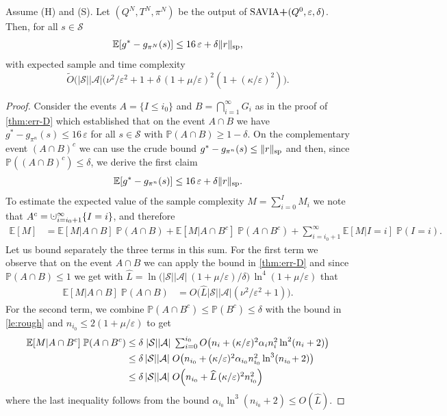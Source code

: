 \documentclass{article}
\newcommand{\cA}{\mathcal{A}}
\newcommand{\cS}{\mathcal{S}}
\newcommand{\expec}{\mathbb{E}}
\newcommand{\prob}{\mathbb{P}}
\renewcommand{\sp}[1]{\|{#1}\|_\text{\rm sp}}
\newcommand{\R}{r}
\newcommand{\cupdot}{\mathbin{\mathaccent\cdot\cup}}
\newenvironment{manualtheorem}[1]{%
    \renewcommand\themanualtheoreminner{#1}%
  \manualtheoreminner
}{\endmanualtheoreminner}
\theoremstyle{plain}
\theoremstyle{definition}
\theoremstyle{remark}
\begin{document}
\vspace{1ex}
\begin{manualtheorem}{\ref{thm:E-err-D}}
Assume \mbox{\sc (H)} and \mbox{\sc (S)}. Let $(Q^N,T^N,\pi^N)$ be the output of $\mbox{\rm SAVIA\textbf{+}}(Q^0,\varepsilon,\delta)$. Then, for all $s\in\cS$
$$\expec[g^*-g_{\pi^N}(s)] \leq 16\,\varepsilon +\delta \sp{r},$$
    with expected sample and time complexity
 $$\widetilde{O}\big(|\cS||\cA|\mbox{$(\nu^{2}/{\varepsilon^{2}}+1 +
    \delta\, (1+\mu/\varepsilon)^2(1+(\kappa/\varepsilon)^2)$}\big).$$
\end{manualtheorem}
\begin{proof}
Consider the events $A= \{I\leq i_0\}$ and $B= \bigcap_{i=1}^\infty G_i$ as in the proof of
\cref{thm:err-D} which established that 
on the event $A\cap B$ we have $g^*-g_{\pi^n}(s)\leq 16\,\varepsilon$ for all $s \in \cS$ with
$\prob(A\cap B)\geq 1-\delta$.
On the complementary event $(A\cap B)^c$ we can use the crude bound $g^*-g_{\pi^n}(s)\leq \sp{\R}$ and then, since $\prob((A\cap B)^c)\leq\delta$, we derive the first claim
    \[
    \expec[g^*-g_{\pi^n}(s)]\leq 16\,\varepsilon +  \delta\sp{\R}.
    \]
To estimate the expected value of the sample complexity $M=\sum_{i=0}^IM_i$ we note
that $A^c= \cupdot_{i=i_0+1}^\infty \{ I=i\}$, 
and therefore
\begin{align*}
    \expec[M]&=\mbox{$\expec[M|A \cap B ]\; \prob(A \cap B) +\expec[M | A \cap B^c ] \;\prob(A \cap B^c)+\sum_{i=i_0+1}^\infty \expec[M | I=i] \;\prob( I=i).$}
\end{align*}  
Let us bound separately the three terms in this sum. 
For the first term we observe that on the event $A\cap B$ we
can apply the bound in \cref{thm:err-D} and since $\prob(A \cap B) \leq1$ we get with $\widehat{L}=\ln\!\big(|\cS||\cA|\,(1\!+\!\mu/\varepsilon)/\delta\big)\,\ln^4(1\!+\!\mu/\varepsilon)$ that
\[
\begin{aligned}
\expec[M|A \cap B ]\; \prob(A \cap B)
&= {O}\big(\widehat{L}|\cS||\cA|(\nu^{2}/{\varepsilon^{2}}+1)\big).
\end{aligned}  
\]
For the second term, we combine $\prob(A \cap B^c)\leq \prob(B^c)\leq \delta $ with the bound in \cref{le:rough} and $n_{i_0}\leq 2(1+\mu/\varepsilon)$ to get
\begin{align*}
\expec[M|A \cap B^c ]\; \prob(A \cap B^c)&\leq \delta\;\mbox{$ |\cS||\cA|\;\sum_{i=0}^{i_0}O\!\left (n_i+{(\kappa/\varepsilon)^2\alpha_i n_i^2 \ln^2(n_i+2)} \right )$}\\&\leq \delta\,|\cS||\cA|\;\mbox{$O \!\left (n_{i_0}+(\kappa/\varepsilon)^2\alpha_{i_{0}} n_{i_{0}}^2 \ln^3(n_{i_0}\!+2) \right ) $}\\&\leq \delta\,|\cS||\cA|\;\mbox{$O \!\left (n_{i_0}+\widehat{L}\,(\kappa/\varepsilon)^2 n_{i_{0}}^2\right ) $}
\end{align*}  
where the last inequality follows from the bound 
$\alpha_{i_0}\ln^3(n_{i_0}\!+2)\leq O(\widehat{L})$.


\end{proof}
\end{document}
